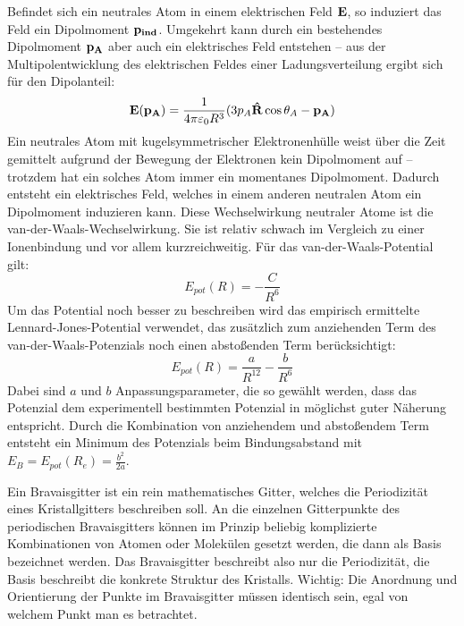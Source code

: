 \label{q:53}

Befindet sich ein neutrales Atom in einem elektrischen Feld $\vb{E}$, so induziert das Feld ein Dipolmoment $\vb{p_{ind}}$. Umgekehrt kann durch ein bestehendes Dipolmoment $\vb{p_A}$ aber auch ein elektrisches Feld entstehen -- aus der Multipolentwicklung des elektrischen Feldes einer Ladungsverteilung ergibt sich für den Dipolanteil:
\begin{equation*}
    \vb{E}(\vb{p_A}) = \frac{1}{4\pi\varepsilon_0 R^3} (3 p_A \vb{\hat{R}} \cos{\theta_A} - \vb{p_A})
\end{equation*}
Ein neutrales Atom mit kugelsymmetrischer Elektronenhülle weist über die Zeit gemittelt aufgrund der Bewegung der Elektronen kein Dipolmoment auf -- trotzdem hat ein solches Atom immer ein momentanes Dipolmoment. Dadurch entsteht ein elektrisches Feld, welches in einem anderen neutralen Atom ein Dipolmoment induzieren kann. Diese Wechselwirkung neutraler Atome ist die van-der-Waals-Wechselwirkung. Sie ist relativ schwach im Vergleich zu einer Ionenbindung und vor allem kurzreichweitig. Für das van-der-Waals-Potential gilt:
\begin{equation}
    E_{pot}(R) = -\frac{C}{R^6}
\end{equation}
Um das Potential noch besser zu beschreiben wird das empirisch ermittelte Lennard-Jones-Potential verwendet, das zusätzlich zum anziehenden Term des van-der-Waals-Potenzials noch einen abstoßenden Term berücksichtigt:
\begin{equation}
    E_{pot}(R) = \frac{a}{R^{12}} - \frac{b}{R^6}
\end{equation}
Dabei sind $a$ und $b$ Anpassungsparameter, die so gewählt werden, dass das Potenzial dem experimentell bestimmten Potenzial in möglichst guter Näherung entspricht. Durch die Kombination von anziehendem und abstoßendem Term entsteht ein Minimum des Potenzials beim Bindungsabstand mit $E_B = E_{pot}(R_e) = \frac{b^2}{2a}$.


\label{q:54}

Ein Bravaisgitter ist ein rein mathematisches Gitter, welches die Periodizität eines Kristallgitters beschreiben soll. An die einzelnen Gitterpunkte des periodischen Bravaisgitters können im Prinzip beliebig komplizierte Kombinationen von Atomen oder Molekülen gesetzt werden, die dann als Basis bezeichnet werden. Das Bravaisgitter beschreibt also nur die Periodizität, die Basis beschreibt die konkrete Struktur des Kristalls. Wichtig: Die Anordnung und Orientierung der Punkte im Bravaisgitter müssen identisch sein, egal von welchem Punkt man es betrachtet.

